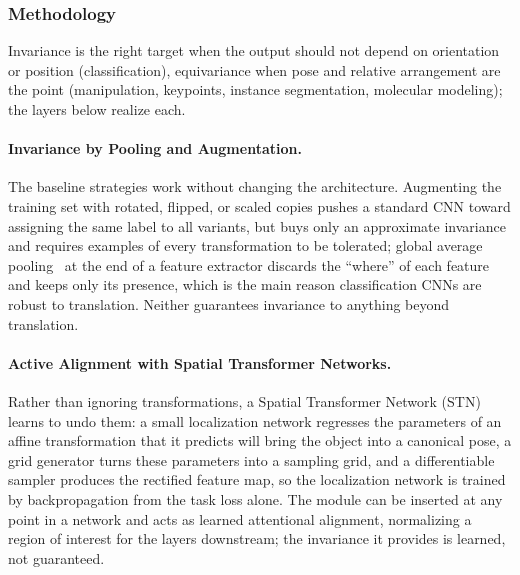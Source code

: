 \subsubsection{Methodology}

Invariance is the right target when the output should not depend on orientation or position (classification), equivariance when pose and relative arrangement are the point (manipulation, keypoints, instance segmentation, molecular modeling); the layers below realize each.

\paragraph{Invariance by Pooling and Augmentation.}
The baseline strategies work without changing the architecture.
Augmenting the training set with rotated, flipped, or scaled copies pushes a standard CNN toward assigning the same label to all variants, but buys only an approximate invariance and requires examples of every transformation to be tolerated; global average pooling~\cite{lin2013network} at the end of a feature extractor discards the ``where'' of each feature and keeps only its presence, which is the main reason classification CNNs are robust to translation.
Neither guarantees invariance to anything beyond translation.

\paragraph{Active Alignment with Spatial Transformer Networks.}
Rather than ignoring transformations, a Spatial Transformer Network (STN)~\cite{jaderberg2015spatial} learns to undo them: a small localization network regresses the parameters of an affine transformation that it predicts will bring the object into a canonical pose, a grid generator turns these parameters into a sampling grid, and a differentiable sampler produces the rectified feature map, so the localization network is trained by backpropagation from the task loss alone.
The module can be inserted at any point in a network and acts as learned attentional alignment, normalizing a region of interest for the layers downstream; the invariance it provides is learned, not guaranteed.

